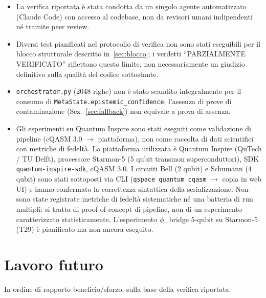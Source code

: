 \documentclass[11pt,a4paper]{article}
\newcommand{\code}[1]{\texttt{#1}}
\newcommand{\starmon}{Starmon-5\xspace}
\begin{document}
\begin{itemize}
  \item La verifica riportata \`e stata condotta da un singolo agente automatizzato (Claude Code) con accesso al codebase, non da revisori umani indipendenti n\'e tramite peer review.
  \item Diversi test pianificati nel protocollo di verifica non sono stati eseguibili per il blocco strutturale descritto in~\ref{sec:blocco}; i verdetti ``PARZIALMENTE VERIFICATO'' riflettono questo limite, non necessariamente un giudizio definitivo sulla qualit\`a del codice sottostante.
  \item \code{orchestrator.py} (2048 righe) non \`e stato scandito integralmente per il consumo di \code{MetaState.epistemic\_confidence}; l'assenza di prove di contaminazione (Sez.~\ref{sec:fallback}) non equivale a prova di assenza.
  \item Gli esperimenti su Quantum Inspire sono stati eseguiti come validazione di pipeline (cQASM 3.0 $\to$ piattaforma), non come raccolta di dati scientifici con metriche di fedelt\`a. La piattaforma utilizzata \`e Quantum Inspire (QuTech / TU Delft), processore \starmon{} (5 qubit transmon superconduttori), SDK \code{quantum-inspire-sdk}, cQASM 3.0. I circuiti Bell (2 qubit) e Schumann (4 qubit) sono stati sottoposti via CLI (\code{qspace quantum cqasm} $\to$ copia in web UI) e hanno confermato la correttezza sintattica della serializzazione. Non sono state registrate metriche di fedelt\`a sistematiche n\'e una batteria di run multipli: si tratta di proof-of-concept di pipeline, non di un esperimento caratterizzato statisticamente. L'esperimento $\phi$\_bridge 5-qubit su \starmon{} (T29) \`e pianificato ma non ancora eseguito.
\end{itemize}

\section{Lavoro futuro}
\label{sec:future}

In ordine di rapporto beneficio/sforzo, sulla base della verifica riportata:
\end{document}
